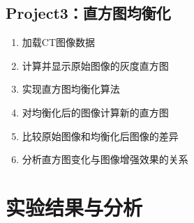 \documentclass[10.5pt]{config}
\begin{document}
\subsection{Project3：直方图均衡化}
\begin{enumerate}
    \item 加载CT图像数据
    \item 计算并显示原始图像的灰度直方图
    \item 实现直方图均衡化算法
    \item 对均衡化后的图像计算新的直方图
    \item 比较原始图像和均衡化后图像的差异
    \item 分析直方图变化与图像增强效果的关系
\end{enumerate}

\section{实验结果与分析}
\end{document}
